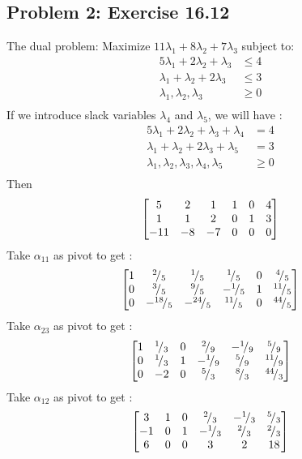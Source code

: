 \documentclass{article}
\newcommand*\rfrac[2]{{}^{#1}\!/_{#2}}
\begin{document}
\subsection*{{Problem 2: Exercise 16.12}}
\label{}
The dual problem:  Maximize $11\lambda_1 + 8\lambda_2 + 7 \lambda_3 $ subject to:
\begin{align*} 
5\lambda_1 + 2 \lambda_2 + \lambda_3 &\leq 4 \\
\lambda_1 +  \lambda_2 + 2\lambda_3 &\leq 3 \\
\lambda_1 ,  \lambda_2 , \lambda_3 & \geq 0 \\
\end{align*}
If we introduce slack variables $\lambda_4$ and $\lambda_5$, we will have :\begin{align*} 
5\lambda_1 + 2 \lambda_2 + \lambda_3 + \lambda_4  &= 4 \\
\lambda_1 +  \lambda_2 + 2\lambda_3 + \lambda_5 &= 3 \\
\lambda_1 ,  \lambda_2 , \lambda_3, \lambda_4 , \lambda_5 & \geq 0 \\
\end{align*}
Then \begin{align*} 
\begin{bmatrix} 5 & 2 & 1 & 1 & 0 & 4 \\ 1 & 1 & 2 & 0 & 1 & 3 \\ -11 & -8 & -7 & 0 & 0 & 0  \end{bmatrix}
\end{align*}
Take $\alpha_{11}$ as pivot to get : \begin{align*}
\bmat{1 & \rfrac{2}{5} & \rfrac{1}{5} & \rfrac{1}{5} & 0 & \rfrac{4}{5} \\ 0 & \rfrac{3}{5} & \rfrac{9}{5} & -\rfrac{1}{5} & 1 & \rfrac{11}{5} \\
0 & -\rfrac{18}{5} & -\rfrac{24}{5} & \rfrac{11}{5} & 0 & \rfrac{44}{5} }
\end{align*}
Take $\alpha_{23}$ as pivot to get : \begin{align*}
\bmat{1 & \rfrac{1}{3} & 0 & \rfrac{2}{9} & -\rfrac{1}{9} &  \rfrac{5}{9} \\ 0 & \rfrac{1}{3} &1 & -\rfrac{1}{9} & \rfrac{5}{9} & \rfrac{11}{9} \\
0 & -2 & 0 & \rfrac{5}{3} & \rfrac{8}{3} & \rfrac{44}{3} }
\end{align*} 
Take $\alpha_{12}$ as pivot to get : \begin{align*}
\bmat{3 & 1 & 0 & \rfrac{2}{3} & -\rfrac{1}{3} & \rfrac{5}{3} \\
-1 & 0 & 1 & -\rfrac{1}{3} & \rfrac{2}{3} & \rfrac{2}{3}  \\
6 & 0 & 0 & 3 & 2 & 18 }
\end{align*}
\end{document}
